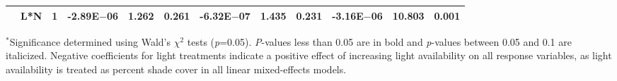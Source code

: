 \begin{landscape}
\begin{table}
{\begin{tabular}{p{0.1cm}p{2.5cm}p{0.5cm}p{1.75cm}p{1.5cm}p{1.5cm}p{1.75cm}p{1.5cm}p{1.5cm}p{1.75cm}p{1.5cm}p{1.5cm}}
         & L*N
         & \multicolumn{1}{r}{1}
         & \multicolumn{1}{r}{-2.89E$-$06}    & \multicolumn{1}{r}{1.262}     & \multicolumn{1}{r}{0.261}                
         & \multicolumn{1}{r}{-6.32E$-$07}    & \multicolumn{1}{r}{1.435}     & \multicolumn{1}{r}{0.231}                
         & \multicolumn{1}{r}{-3.16E$-$06}    & \multicolumn{1}{r}{10.803}    & \multicolumn{1}{r}{\textbf{0.001}} 
         \\ 
         \hline 
\end{tabular}}
\label{tab:table2.1}
\end{table}
\begin{singlespace}
    \noindent $^{*}$Significance determined using Wald’s $\chi^{2}$ tests (\textit{p}=0.05). \textit{P}-values less than 0.05 are in bold and \textit{p}-values between 0.05 and 0.1 are italicized. Negative coefficients for light treatments indicate a positive effect of increasing light availability on all response variables, as light availability is treated as percent shade cover in all linear mixed-effects models.
\end{singlespace}
\end{landscape}
\clearpage

